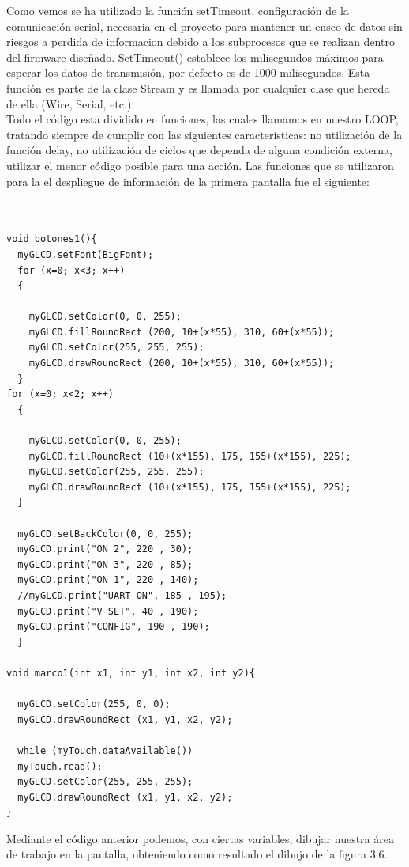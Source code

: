 Como vemos se ha utilizado la función setTimeout, configuración de la comunicación serial, necesaria en el proyecto para mantener un enseo de datos sin riesgos a perdida de informacion debido a los subprocesos que se realizan dentro del firmware diseñado. SetTimeout() establece los milisegundos máximos para esperar los datos de transmisión, por defecto es de 1000 milisegundos. Esta función es parte de la clase Stream y es llamada por cualquier clase que hereda de ella (Wire, Serial, etc.). \cite{settime}\\


Todo el código esta dividido en funciones, las cuales llamamos en nuestro LOOP, tratando siempre de cumplir con las siguientes características: no utilización de la función delay, no utilización de ciclos que dependa de alguna condición externa, utilizar el menor código posible para una acción. Las funciones que se utilizaron para la el despliegue de información de la primera pantalla fue el siguiente:


\begin{verbatim}

 
void botones1(){ 
  myGLCD.setFont(BigFont); 
  for (x=0; x<3; x++)
  {
  
    myGLCD.setColor(0, 0, 255);
    myGLCD.fillRoundRect (200, 10+(x*55), 310, 60+(x*55));
    myGLCD.setColor(255, 255, 255);
    myGLCD.drawRoundRect (200, 10+(x*55), 310, 60+(x*55));
  }
for (x=0; x<2; x++)
  {
  
    myGLCD.setColor(0, 0, 255);
    myGLCD.fillRoundRect (10+(x*155), 175, 155+(x*155), 225);
    myGLCD.setColor(255, 255, 255);
    myGLCD.drawRoundRect (10+(x*155), 175, 155+(x*155), 225);
  }
  
  myGLCD.setBackColor(0, 0, 255);
  myGLCD.print("ON 2", 220 , 30);
  myGLCD.print("ON 3", 220 , 85);
  myGLCD.print("ON 1", 220 , 140);
  //myGLCD.print("UART ON", 185 , 195);
  myGLCD.print("V SET", 40 , 190);
  myGLCD.print("CONFIG", 190 , 190);
  }
  
void marco1(int x1, int y1, int x2, int y2){ 

  myGLCD.setColor(255, 0, 0);
  myGLCD.drawRoundRect (x1, y1, x2, y2);
  
  while (myTouch.dataAvailable())
  myTouch.read();
  myGLCD.setColor(255, 255, 255);
  myGLCD.drawRoundRect (x1, y1, x2, y2);
}
\end{verbatim}

Mediante el código anterior podemos, con ciertas variables, dibujar nuestra área de trabajo en la pantalla, obteniendo como resultado el dibujo de la figura 3.6.

